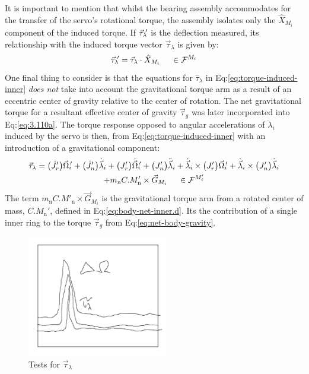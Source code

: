\par
It is important to mention that whilst the bearing assembly accommodates for the transfer of the servo's rotational torque, the assembly isolates only the $\hat{X}_{M_i}$ component of the induced torque. If $\vec{\tau}_{\lambda}\text{}\hspace{-2pt}'$ is the deflection measured, its relationship with the induced torque vector $\vec{\tau}_{\lambda}$ is given by:
\begin{equation}
\vec{\tau}_{\lambda}\text{}\hspace{-2pt}'=\vec{\tau}_{\lambda}\cdot\hat{X}_{M_i}~~~~\in\mathcal{F}^{M_i}
\end{equation}
One final thing to consider is that the equations for $\hat{\tau}_\lambda$ in Eq:\ref{eq:torque-induced-inner} \emph{does not} take into account the gravitational torque arm as a result of an eccentric center of gravity relative to the center of rotation. The net gravitational torque for a resultant effective center of gravity $\vec{\tau}_g$ was later incorporated into Eq:\ref{eq:3.110a}. The torque response opposed to angular accelerations of $\ddot{\lambda}_i$ induced by the servo is then, from Eq:\ref{eq:torque-induced-inner} with an introduction of a gravitational component:
\begin{multline}\label{eq:model-inner}
\vec{\tau}_\lambda=\big(\dot{J}_{r}'\big)\vec{\Omega}_i\text{}\hspace{-2pt}'+\big(\dot{J}_{n}'\big)\dot{\vec{\lambda}}_i+\big(J_r'\big)\dot{\vec{\Omega}}_i\text{}\hspace{-2pt}'+\big(J_{n}'\big)\ddot{\vec{\lambda}}_i+\dot{\vec{\lambda}}_i\times \big(J_r'\big)\vec{\Omega}_i\text{}\hspace{-2pt}'+\dot{\vec{\lambda}}_i\times \big(J_{n}'\big)\dot{\vec{\lambda}}_i
\\
+m_\text{n}C.M'_{\text{n}}\times\vec{G}_{M_i}~~~~\in\mathcal{F}^{M_i'}
\end{multline}
The term $m_\text{n}C.M'_{\text{n}}\times\vec{G}_{M_i}$ is the gravitational torque arm from a rotated center of mass, $C.M_{\text{n}}'$, defined in Eq:\ref{eq:body-net-inner.d}. Its the contribution of a single inner ring to the torque $\vec{\tau}_g$ from Eq:\ref{eq:net-body-gravity}.
\par
\begin{figure}[hbtp]
\centering
\includegraphics[width=0.55\textwidth]{graphs/tau-lambda}
\caption{Tests for $\vec{\tau}_\lambda$}
\label{fig:tau-lambda}
\vspace{-15pt}
\end{figure}
